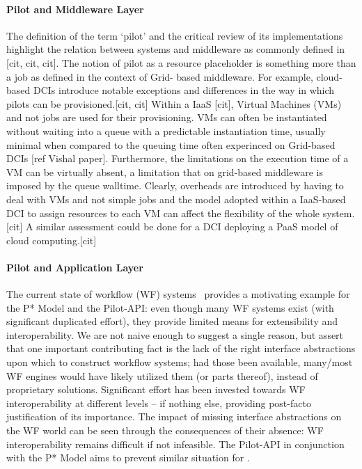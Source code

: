 \documentclass{sig-alternate}
\begin{document}
\paragraph*{Pilot and Middleware Layer} The definition of the term
`pilot' and the critical review of its implementations highlight the
relation between \pilot systems and middleware as commonly defined in
[cit, cit, cit]. The notion of pilot as a resource placeholder is
something more than a job as defined in the context of Grid- based
middleware. For example, cloud-based DCIs  introduce notable exceptions
and differences in the way in which pilots can be provisioned.[cit, cit]
Within a IaaS [cit], Virtual Machines (VMs) and not jobs are used for
their provisioning. VMs can often be instantiated without waiting into a
queue  with a predictable instantiation time, usually minimal when
compared to the queuing time often experinced on Grid-based DCIs [ref
Vishal paper]. Furthermore, the limitations on the execution time of a
VM can be virtually absent, a limitation that on grid-based middleware
is imposed by the queue walltime. Clearly, overheads are introduced by
having to deal with VMs and not simple jobs and the model adopted within
a IaaS-based DCI to assign resources to each VM can affect the
flexibility of the whole \pilotjob system. [cit] A similar assessment
could be done for a DCI deploying a PaaS model of cloud computing.[cit]

\paragraph*{Pilot and Application Layer} The current state of workflow
(WF) systems~\cite{nsf-workflow,1196459} provides a motivating example
for the P* Model and the Pilot-API: even though many WF systems exist
(with significant duplicated effort), they provide limited means for
extensibility and interoperability.  We are not naive enough to suggest
a single reason, but assert that one important contributing fact is the
lack of the right interface abstractions upon which to construct
workflow systems; had those been available, many/most WF engines would
have likely utilized them (or parts thereof), instead of proprietary
solutions. Significant effort has been invested towards WF
interoperability at different levels -- if nothing else, providing
post-facto justification of its importance. The impact of missing
interface abstractions on the WF world can be seen through the
consequences of their absence: WF interoperability remains difficult if
not infeasible. The Pilot-API in conjunction with the P* Model aims to
prevent similar situation for \pilotjobs.
\end{document}
